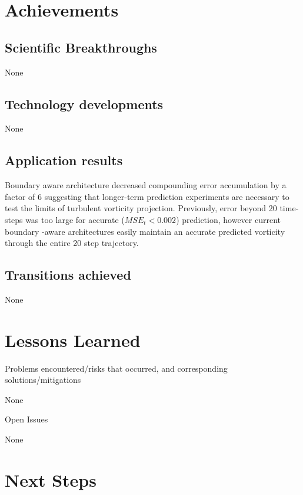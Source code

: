 \documentclass[12pt]{article}
\theoremstyle{plain}
\theoremstyle{remark}
\theoremstyle{definition}
\begin{document}
\section{Achievements}

\subsection{Scientific Breakthroughs}

None

\subsection{Technology developments}

None 

\subsection{Application results}

Boundary aware architecture decreased compounding error accumulation by a factor of 6 suggesting that longer-term prediction experiments are necessary to test the limits of turbulent vorticity projection. Previously, error beyond 20 time-steps was too large for accurate ($MSE_t < 0.002$) prediction, however current boundary -aware architectures easily maintain an accurate predicted vorticity through the entire 20 step trajectory.%

\subsection{Transitions achieved}

None

\section{Lessons Learned}


\noindent Problems encountered/risks that occurred, and corresponding solutions/mitigations

None

\noindent Open Issues

None

\section{Next Steps}
\end{document}
